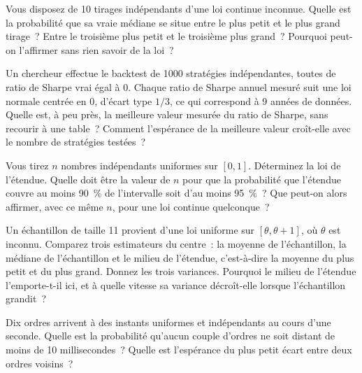 \begin{question}\label{iq:iv1:order-statistics:10}
Vous disposez de 10 tirages indépendants d'une loi continue inconnue. Quelle est la probabilité que sa vraie médiane se situe entre le plus petit et le plus grand tirage~? Entre le troisième plus petit et le troisième plus grand~? Pourquoi peut-on l'affirmer sans rien savoir de la loi~?
\end{question}

\begin{question}\label{iq:iv1:order-statistics:11}
Un chercheur effectue le backtest de 1000 stratégies indépendantes, toutes de ratio de Sharpe vrai égal à 0. Chaque ratio de Sharpe annuel mesuré suit une loi normale centrée en 0, d'écart type $1/3$, ce qui correspond à 9 années de données. Quelle est, à peu près, la meilleure valeur mesurée du ratio de Sharpe, sans recourir à une table~? Comment l'espérance de la meilleure valeur croît-elle avec le nombre de stratégies testées~?
\end{question}

\begin{question}\label{iq:iv1:order-statistics:12}
Vous tirez $n$ nombres indépendants uniformes sur $[0, 1]$. Déterminez la loi de l'étendue. Quelle doit être la valeur de $n$ pour que la probabilité que l'étendue couvre au moins 90~\% de l'intervalle soit d'au moins 95~\%~? Que peut-on alors affirmer, avec ce même $n$, pour une loi continue quelconque~?
\end{question}

\begin{question}\label{iq:iv1:order-statistics:13}
Un échantillon de taille 11 provient d'une loi uniforme sur $[\theta, \theta + 1]$, où $\theta$ est inconnu. Comparez trois estimateurs du centre~: la moyenne de l'échantillon, la médiane de l'échantillon et le milieu de l'étendue, c'est-à-dire la moyenne du plus petit et du plus grand. Donnez les trois variances. Pourquoi le milieu de l'étendue l'emporte-t-il ici, et à quelle vitesse sa variance décroît-elle lorsque l'échantillon grandit~?
\end{question}

\begin{question}\label{iq:iv1:order-statistics:14}
Dix ordres arrivent à des instants uniformes et indépendants au cours d'une seconde. Quelle est la probabilité qu'aucun couple d'ordres ne soit distant de moins de 10 millisecondes~? Quelle est l'espérance du plus petit écart entre deux ordres voisins~?
\end{question}


